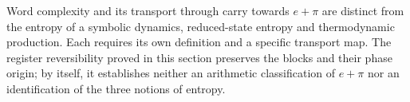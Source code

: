 \begin{remark}
Word complexity and its transport through carry towards $e+\pi$
are distinct from the entropy of a symbolic dynamics, reduced-state
entropy and thermodynamic production. Each requires its own definition
and a specific transport map. The register reversibility proved in
this section preserves the blocks and their phase origin; by itself,
it establishes neither an arithmetic classification of $e+\pi$ nor
an identification of the three notions of entropy.
\end{remark}
